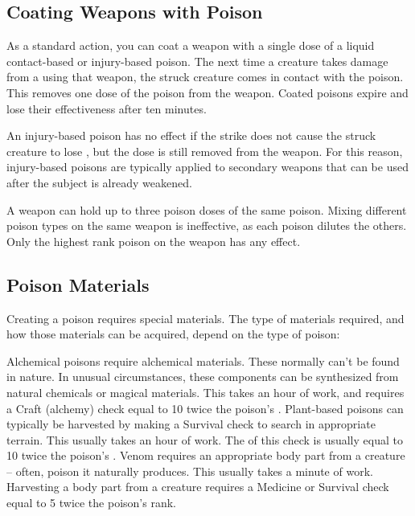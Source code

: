   \subsection{Coating Weapons with Poison}\label{Coating Weapons with Poison}
    As a standard action, you can coat a weapon with a single dose of a liquid contact-based or injury-based poison.
    The next time a creature takes damage from a  using that weapon, the struck creature comes in contact with the poison.
    This removes one dose of the poison from the weapon.
    Coated poisons expire and lose their effectiveness after ten minutes.

    An injury-based poison has no effect if the strike does not cause the struck creature to lose , but the dose is still removed from the weapon.
    For this reason, injury-based poisons are typically applied to secondary weapons that can be used after the subject is already weakened.

    A weapon can hold up to three poison doses of the same poison.
    Mixing different poison types on the same weapon is ineffective, as each poison dilutes the others.
    Only the highest rank poison on the weapon has any effect.

  \subsection{Poison Materials}\label{Poison Materials}
    Creating a poison requires special materials.
    The type of materials required, and how those materials can be acquired, depend on the type of poison:

    \begin{itemize}
       Alchemical poisons require alchemical materials.
        These normally can't be found in nature.
        In unusual circumstances, these components can be synthesized from natural chemicals or magical materials.
        This takes an hour of work, and requires a Craft (alchemy) check equal to 10 \add twice the poison's .
       Plant-based poisons can typically be harvested by making a Survival check to search in appropriate terrain.
        This usually takes an hour of work.
        The  of this check is usually equal to 10 \add twice the poison's .
       Venom requires an appropriate body part from a creature -- often, poison it naturally produces.
        This usually takes a minute of work.
        Harvesting a body part from a creature requires a Medicine or Survival check equal to 5 \add twice the poison's rank.
    \end{itemize}
